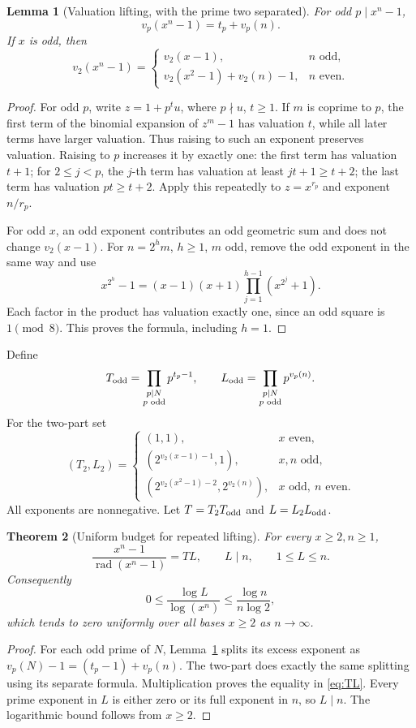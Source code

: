 \documentclass[11pt]{article}
\newtheorem{theorem}{Theorem}[section]
\newtheorem{lemma}[theorem]{Lemma}
\theoremstyle{definition}\newtheorem{definition}[theorem]{Definition}
\theoremstyle{remark}\newtheorem{remark}[theorem]{Remark}
\newcommand{\rad}{\operatorname{rad}}
\begin{document}
\begin{lemma}[Valuation lifting, with the prime two separated]\label{lem:lte}
For odd \(p\mid x^n-1\),
\[
 v_p(x^n-1)=t_p+v_p(n).
\]
If \(x\) is odd, then
\[
 v_2(x^n-1)=
 \begin{cases}
 v_2(x-1),&n\text{ odd},\\
 v_2(x^2-1)+v_2(n)-1,&n\text{ even}.
 \end{cases}
\]
\end{lemma}
\begin{proof}
For odd \(p\), write \(z=1+p^t u\), where \(p\nmid u\), \(t\ge1\). If \(m\) is coprime to \(p\), the first term of the binomial expansion of \(z^m-1\) has valuation \(t\), while all later terms have larger valuation. Thus raising to such an exponent preserves valuation. Raising to \(p\) increases it by exactly one: the first term has valuation \(t+1\); for \(2\le j<p\), the \(j\)-th term has valuation at least \(jt+1\ge t+2\); the last term has valuation \(pt\ge t+2\). Apply this repeatedly to \(z=x^{r_p}\) and exponent \(n/r_p\).

For odd \(x\), an odd exponent contributes an odd geometric sum and does not change \(v_2(x-1)\). For \(n=2^h m\), \(h\ge1\), \(m\) odd, remove the odd exponent in the same way and use
\[
 x^{2^h}-1=(x-1)(x+1)\prod_{j=1}^{h-1}(x^{2^j}+1).
\]
Each factor in the product has valuation exactly one, since an odd square is \(1\pmod8\). This proves the formula, including \(h=1\).
\end{proof}

Define
\[
 T_{\rm odd}=\prod_{\substack{p\mid N\\p\text{ odd}}}p^{t_p-1},\qquad
 L_{\rm odd}=\prod_{\substack{p\mid N\\p\text{ odd}}}p^{v_p(n)}.
\]
For the two-part set
\[
 (T_2,L_2)=
 \begin{cases}
 (1,1),&x\text{ even},\\
 (2^{v_2(x-1)-1},1),&x,n\text{ odd},\\
 (2^{v_2(x^2-1)-2},2^{v_2(n)}),&x\text{ odd},\ n\text{ even}.
 \end{cases}
\]
All exponents are nonnegative. Let \(T=T_2T_{\rm odd}\) and \(L=L_2L_{\rm odd}\).

\begin{theorem}[Uniform budget for repeated lifting]\label{thm:lift}
For every \(x\ge2,n\ge1\),
\begin{equation}\label{eq:TL}
 \frac{x^n-1}{\rad(x^n-1)}=TL,\qquad L\mid n,\qquad 1\le L\le n.
\end{equation}
Consequently
\[
 0\le\frac{\log L}{\log(x^n)}\le\frac{\log n}{n\log2},
\]
which tends to zero uniformly over all bases \(x\ge2\) as \(n\to\infty\).
\end{theorem}
\begin{proof}
For each odd prime of \(N\), Lemma~\ref{lem:lte} splits its excess exponent as
\(v_p(N)-1=(t_p-1)+v_p(n)\). The two-part does exactly the same splitting using its separate formula. Multiplication proves the equality in \eqref{eq:TL}. Every prime exponent in \(L\) is either zero or its full exponent in \(n\), so \(L\mid n\). The logarithmic bound follows from \(x\ge2\).
\end{proof}
\end{document}

